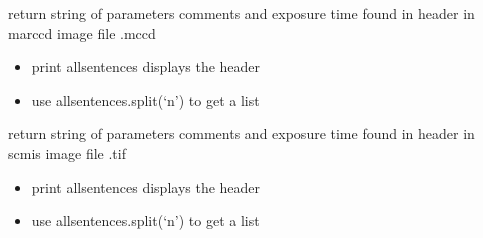 \documentclass[letterpaper,10pt,english]{sphinxmanual}
\begin{document}

\begin{fulllineitems}
\label{\detokenize{PeakSearch:LaueTools.readmccd.read_header_marccd2}}
return string of parameters comments and exposure time
found in header in marccd image file .mccd
\begin{itemize}
\item {} 
print allsentences  displays the header

\item {} 
use allsentences.split(‘n’) to get a list

\end{itemize}

\end{fulllineitems}


\begin{fulllineitems}
\label{\detokenize{PeakSearch:LaueTools.readmccd.read_header_scmos}}
return string of parameters comments and exposure time
found in header in scmis image file .tif
\begin{itemize}
\item {} 
print allsentences  displays the header

\item {} 
use allsentences.split(‘n’) to get a list

\end{itemize}

\end{fulllineitems}

\end{document}
